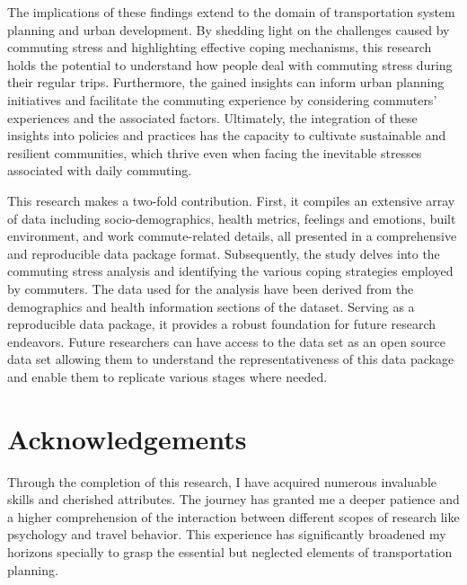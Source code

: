 \documentclass[
11pt, %
oneside, %
english, %
singlespacing, %
]{macthesis} %
\begin{document}
The implications of these findings extend to the domain of transportation system planning and urban development. By shedding light on the challenges caused by commuting stress and highlighting effective coping mechanisms, this research holds the potential to understand how people deal with commuting stress during their regular trips. Furthermore, the gained insights can inform urban planning initiatives and facilitate the commuting experience by considering commuters' experiences and the associated factors. Ultimately, the integration of these insights into policies and practices has the capacity to cultivate sustainable and resilient communities, which thrive even when facing the inevitable stresses associated with daily commuting.

This research makes a two-fold contribution. First, it compiles an extensive array of data including socio-demographics, health metrics, feelings and emotions, built environment, and work commute-related details, all presented in a comprehensive and reproducible data package format. Subsequently, the study delves into the commuting stress analysis and identifying the various coping strategies employed by commuters. The data used for the analysis have been derived from the demographics and health information sections of the dataset. Serving as a reproducible data package, it provides a robust foundation for future research endeavors. Future researchers can have access to the data set as an open source data set allowing them to understand the representativeness of this data package and enable them to replicate various stages where needed.
\clearpage


\section*{Acknowledgements}
  Through the completion of this research, I have acquired numerous invaluable skills and cherished attributes. The journey has granted me a deeper patience and a higher comprehension of the interaction between different scopes of research like psychology and travel behavior. This experience has significantly broadened my horizons specially to grasp the essential but neglected elements of transportation planning.
\end{document}
